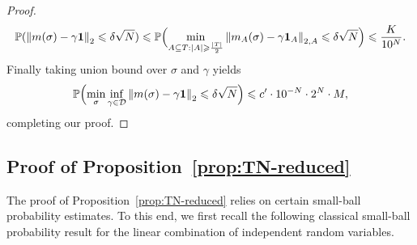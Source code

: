 \documentclass[letterpaper,11pt,reqno]{amsart}
\renewcommand{\le}{\leqslant}
\renewcommand{\ge}{\geqslant}
\newcommand{\norm}[1]{\left\Vert#1\right\Vert}
\newcommand{\abs}[1]{\left\vert#1\right\vert}
\newcommand{\cD}{\mathcal{D}}\newcommand{\cE}{\mathcal{E}}\newcommand{\cF}{\mathcal{F}}
\newcommand{\mv}[1]{\boldsymbol{#1}}\newcommand{\mvinfty}{\boldsymbol{\infty}}\newcommand{\mvzero}{\boldsymbol{0}}
\newcommand{\mvm}{{m}}
\newcommand{\mvgs}{{\sigma}}
\newcommand{\bP}{\mathbb{P}}\newcommand{\bQ}{\mathbb{Q}}\newcommand{\bR}{\mathbb{R}}
\begin{document}
\begin{proof}
\[
\bP(\norm{\mvm(\mvgs)-\gamma  \mv1}_2 \le \gd \sqrt{N}) \le \bP\Bigl( \min_{ A\subseteq T: |A| \ge \frac{\abs{T}}{2}}  \norm{\mvm_A(\mvgs) - \gamma \mv1_A}_{2,A} \le \gd \sqrt{N}\Bigr) \le \frac{K}{10^N}.
\]
Finally taking union bound over $\mvgs$ and $\gamma$ yields
\[
\bP\Bigl(\min_{\mvgs} \inf_{\gamma\in \cD} \norm{\mvm(\mvgs) - \gamma \mv1}_2\le \gd \sqrt{N}\Bigr) \le c' \cdot 10^{-N}\cdot 2^{N} \cdot M,
\]
completing our proof.
\end{proof}











 

\subsection{Proof of Proposition~\ref{prop:TN-reduced}}\label{ssec:pf-TN}
The proof of Proposition~\ref{prop:TN-reduced} relies on certain small-ball probability estimates. To this end, we first recall the following classical small-ball probability result for the linear combination of independent random variables. 
\end{document}
